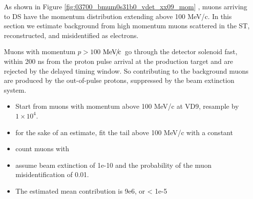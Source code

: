 \documentclass[12pt]{article}
\newcommand {\MeVc}       {\mbox{$\rm MeV\!/\!c$}}
\begin{document}
As shown in Figure \ref{fig:03700_bmum0s31b0_vdet_xx09_mom} , muons arriving to DS
have the momentum distribution extending above 100 MeV/c.
In this section we estimate background from high momentum muons scattered in the ST,
reconstructed, and misidentified as electrons.

Muons with momentum $p > 100$  \MeVc\ go through the detector solenoid fast,
within 200 ns from the proton pulse arrival at the production target and are rejected
by the delayed timing window. So contributing to the background muons are produced
by the out-of-pulse protons, suppressed by the beam extinction system. 

\begin{itemize}
\item 
  Start from muons with momentum above 100 MeV/c at VD9, resample by $1\times 10^4$. 
\item
  for the sake of an estimate, fit the tail above 100 MeV/c with a constant
\item
  count muons with 
\item
  assume beam extinction of 1e-10 and the probability of the muon misidentification of 0.01. 
\item
  The estimated mean contribution is 9e6, or < 1e-5
\end{itemize}
\end{document}
